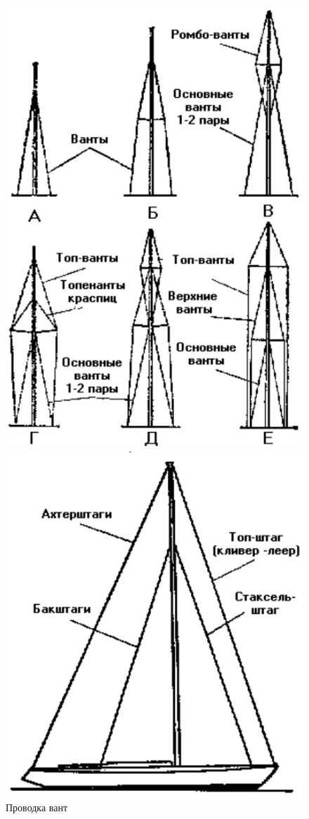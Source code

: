 \documentclass[a4paper, 12pt, twoside, final]{scrbook}
\begin{document}
\begin{figure}[htbp]
	\begin{minipage}[b]{0.49\textwidth}
		\centering\includegraphics{pics/38_Provodka_vant}
		\caption{Проводка вант}
		\label{fig:38}
	\end{minipage}
	\hfil\hfil%
	\begin{minipage}[b]{0.49\textwidth}
		\centering\includegraphics{pics/Provodka_shtagov}

\end{minipage}
\end{figure}
\end{document}
